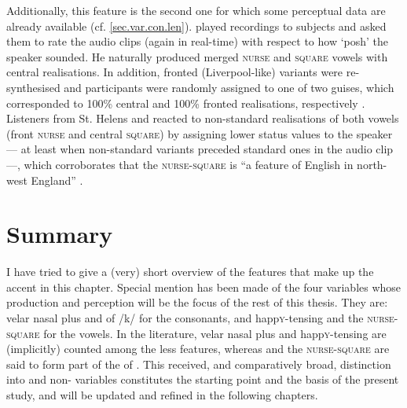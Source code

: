 Additionally, this feature is the second one for which some perceptual data are already available (cf. \ref{sec.var.con.len}).
\textcite{watsonclark2013} played recordings to subjects and asked them to rate the audio clips (again in real-time) with respect to how `posh' the speaker sounded.
He naturally produced merged \textsc{nurse} and \textsc{square} vowels with central realisations.
In addition, fronted (Liverpool-like) variants were re-synthesised and participants were randomly assigned to one of two guises, which corresponded to 100\% central and 100\% fronted realisations, respectively \parencite[cf.][305--306]{watsonclark2013}.
Listeners from St. Helens and  reacted to non-standard realisations of both vowels (front \textsc{nurse} and central \textsc{square}) by assigning lower status values to the speaker --- at least when non-standard variants preceded standard ones in the audio clip ---, which corroborates that the \textsc{nurse}-\textsc{square}  is ``a  feature of English in north-west England'' \parencite[cf.][317--320]{watsonclark2013}.

	\section{Summary}

I have tried to give a (very) short overview of the features that make up the  accent in this chapter.
Special mention has been made of the four variables whose production and perception will be the focus of the rest of this thesis.
They are: velar nasal plus and  of /k/ for the consonants, and happ\textsc{y}-tensing and the \textsc{nurse}-\textsc{square}  for the vowels.
In the literature, velar nasal plus and happ\textsc{y}-tensing are (implicitly) counted among the less  features, whereas  and the \textsc{nurse}-\textsc{square}  are said to form part of the  of .
This received, and comparatively broad, distinction into  and non- variables constitutes the starting point and the basis of the present study, and will be updated and refined in the following chapters.